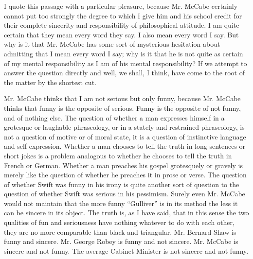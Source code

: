 I quote this passage with a particular pleasure, because Mr. McCabe certainly cannot put too strongly the degree to which I give him and his school credit for their complete sincerity and responsibility of philosophical attitude. I am quite certain that they mean every word they say. I also mean every word I say. But why is it that Mr. McCabe has some sort of mysterious hesitation about admitting that I mean every word I say; why is it that he is not quite as certain of my mental responsibility as I am of his mental responsibility? If we attempt to answer the question directly and well, we shall, I think, have come to the root of the matter by the shortest cut.

Mr. McCabe thinks that I am not serious but only funny, because Mr. McCabe thinks that funny is the opposite of serious. Funny is the opposite of not funny, and of nothing else. The question of whether a man expresses himself in a grotesque or laughable phraseology, or in a stately and restrained phraseology, is not a question of motive or of moral state, it is a question of instinctive language and self-expression. Whether a man chooses to tell the truth in long sentences or short jokes is a problem analogous to whether he chooses to tell the truth in French or German. Whether a man preaches his gospel grotesquely or gravely is merely like the question of whether he preaches it in prose or verse. The question of whether Swift was funny in his irony is quite another sort of question to the question of whether Swift was serious in his pessimism. Surely even Mr. McCabe would not maintain that the more funny “Gulliver” is in its method the less it can be sincere in its object. The truth is, as I have said, that in this sense the two qualities of fun and seriousness have nothing whatever to do with each other, they are no more comparable than black and triangular. Mr. Bernard Shaw is funny and sincere. Mr. George Robey is funny and not sincere. Mr. McCabe is sincere and not funny. The average Cabinet Minister is not sincere and not funny.

